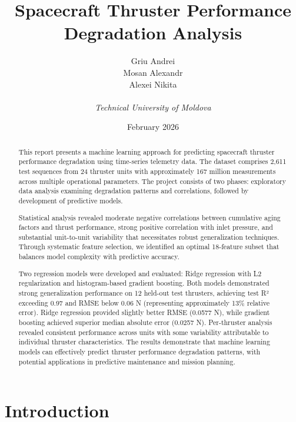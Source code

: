 \documentclass[12pt,a4paper]{article}
\title{\textbf{Spacecraft Thruster Performance Degradation Analysis}}
\author{
    Griu Andrei \\
    Mosan Alexandr \\
    Alexei Nikita \\
    \\
    \textit{Technical University of Moldova}
}
\date{February 2026}
\begin{document}
\maketitle

\begin{abstract}
This report presents a machine learning approach for predicting spacecraft thruster performance degradation using time-series telemetry data. The dataset comprises 2,611 test sequences from 24 thruster units with approximately 167 million measurements across multiple operational parameters. The project consists of two phases: exploratory data analysis examining degradation patterns and correlations, followed by development of predictive models.

Statistical analysis revealed moderate negative correlations between cumulative aging factors and thrust performance, strong positive correlation with inlet pressure, and substantial unit-to-unit variability that necessitates robust generalization techniques. Through systematic feature selection, we identified an optimal 18-feature subset that balances model complexity with predictive accuracy.

Two regression models were developed and evaluated: Ridge regression with L2 regularization and histogram-based gradient boosting. Both models demonstrated strong generalization performance on 12 held-out test thrusters, achieving test R² exceeding 0.97 and RMSE below 0.06 N (representing approximately 13\% relative error). Ridge regression provided slightly better RMSE (0.0577 N), while gradient boosting achieved superior median absolute error (0.0257 N). Per-thruster analysis revealed consistent performance across units with some variability attributable to individual thruster characteristics. The results demonstrate that machine learning models can effectively predict thruster performance degradation patterns, with potential applications in predictive maintenance and mission planning.
\end{abstract}

\newpage
\tableofcontents
\newpage


\section{Introduction}
\end{document}
